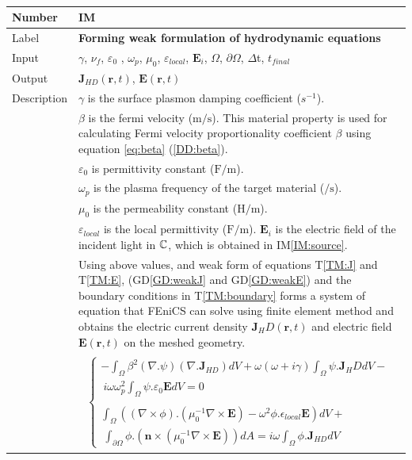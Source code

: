 \documentclass[12pt]{article}
\newcommand{\colBwidth}{0.82\textwidth} \newcommand{\colCwidth}{0.1\textwidth}
\newcounter{instnum} %
\begin{document}
	~\newline \noindent \begin{minipage}{\textwidth}
		\renewcommand*{\arraystretch}{1.5} \begin{tabular}{| p{\colAwidth} |
				p{\colBwidth}|} \hline \rowcolor[gray]{0.9} Number&
			IM{instnum}\theinstnum \label{IM:solve}\\ \hline Label& \bf
			Forming weak formulation of hydrodynamic equations\\ \hline Input& $\gamma$,
			$\nu_f$, $\varepsilon_0$ , $\omega_p$, $\mu_{0}$, $\varepsilon_{local}$,
			$\textbf{E}_i$, $\Omega$, $\partial \Omega$, $\Delta$t, $t_{final}$ \\ \hline
			Output&  $\textbf{J}_{HD}(\textbf{r},t)$, $\textbf{E}(\textbf{r},t)$ \\ \hline
			Description & $\gamma$ is the surface plasmon damping coefficient ($s^{-1}$).\\
			& $\beta$ is the fermi velocity ($\si{\meter \per \second}$). This material
			property is used for calculating Fermi velocity proportionality coefficient
			$\beta$ using equation \ref{eq:beta}  (\ref{DD:beta}).\\ & $\varepsilon_{0}$ is
			permittivity constant ($\si{\farad \per \meter}$). \\ & $\omega_p$ is the plasma
			frequency of the target material ($\si{\per \second}$).\\ & $\mu_{0}$ is the
			permeability constant ($\si{\henry \per \meter}$). \\ & $\varepsilon_{local}$ is
			the local permittivity ($\si{\farad \per \meter}$).
			$\textbf{E}_i$ is the electric field of the incident light in $\Bbb C$, which is obtained in IM\ref{IM:source}.
			\\ & Using above values, and
			weak form of equations T\ref{TM:J} and T\ref{TM:E}, (GD\ref{GD:weakJ} and
			GD\ref{GD:weakE}) and the boundary conditions in T\ref{TM:boundary} forms a
			system of equation that FEniCS can solve using finite element method and obtains
			the electric current density $\textbf{J}_HD(\textbf{r},t)$ and electric field
			$\textbf{E}(\textbf{r},t)$ on the meshed geometry.\\
			
			&	\begin{equation} \label{eq:FEniCS} \begin{gathered} \begin{cases}
						
						-\int_\Omega
						\beta^2(\nabla.\psi)(\nabla.\textbf{J}_{HD})dV+\omega(\omega+i\gamma)\int_{\Omega} \psi. \textbf{J}_HD dV - \\ \ i\omega \omega^2_p \int_\Omega \psi.\varepsilon_{0}\textbf{E}dV = 0 \\ \\ \int_\Omega ((\nabla \times \phi) . (\mu^{-1}_0 \nabla \times \textbf{E})-\omega^2 \phi.\epsilon_{local} \textbf{E}) dV + \\ \ \int_{\partial \Omega} \phi.(\textbf{n} \times (\mu^{-1}_0 \nabla \times \textbf{E}))dA = i\omega \int_\Omega \phi. \textbf{J}_{HD} dV
						

\end{cases}
\end{gathered}
\end{equation}
\end{tabular}
\end{minipage}
\end{document}

